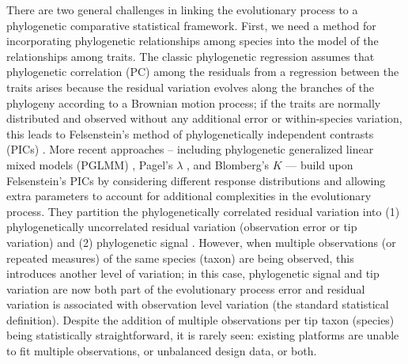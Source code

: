 There are two general challenges in linking the evolutionary process to a phylogenetic comparative statistical framework.
First, we need a method for incorporating phylogenetic relationships among species into the model of the relationships among traits. 
The classic phylogenetic regression assumes that phylogenetic correlation (PC) among the residuals from a regression between the traits arises because the residual variation evolves along the branches of the phylogeny according to a Brownian motion process; if the traits are normally distributed and observed without any additional error or within-species variation, this leads to Felsenstein's method of phylogenetically independent contrasts (PICs) \citep{felsenstein1985phylogenies}.
More recent approaches -- including phylogenetic generalized linear mixed models (PGLMM) \citep{ives2011generalized}, Pagel's $\lambda$ \citep{pagel1999inferring}, and Blomberg's $K$ \citep{blomberg2003testing} --- build upon Felsenstein's PICs by considering different response distributions and allowing extra parameters to account for additional complexities in the evolutionary process. They partition the phylogenetically correlated residual variation into (1) phylogenetically uncorrelated residual variation (observation error or tip variation) and (2) phylogenetic signal  \citep[biological/evolutionary process error:][]{hansen2012interpreting}.
However, when multiple observations (or repeated measures) of the same species (taxon) are being observed, this introduces another level of variation; in this case, phylogenetic signal and tip variation are now both part of the evolutionary process error and residual variation is associated with observation level variation (the standard statistical definition).
Despite the addition of multiple observations per tip taxon (species) being  statistically straightforward, it is rarely seen: existing platforms are unable to fit multiple observations, or unbalanced design data, or both.

